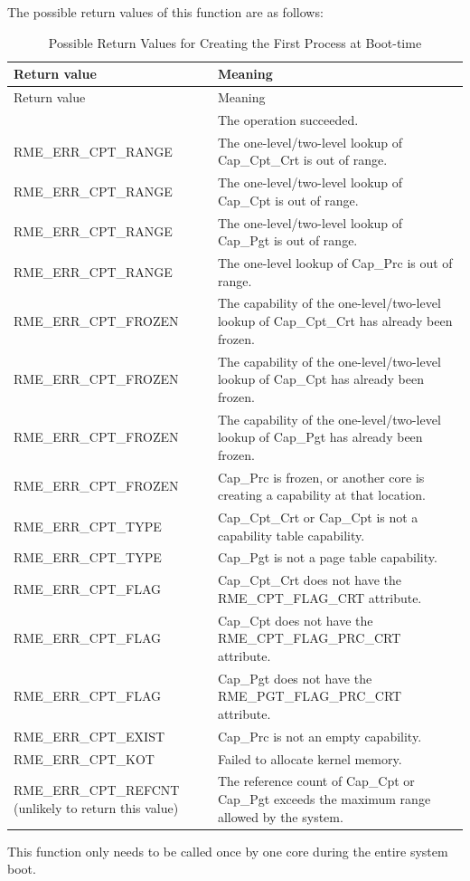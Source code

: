 The possible return values of this function are as follows:

\begin{xltabular}{\textwidth}{@{}>{\hsize\raggedright\arraybackslash}X>{\hsize\raggedright\arraybackslash}X@{}}
\caption{Possible Return Values for Creating the First Process at Boot-time}\label{tab:7-52-create-first-process-at-boot-return-values}\\
\toprule
Return value & Meaning\tabularnewline
\endfirsthead
\toprule
Return value & Meaning\tabularnewline
\midrule
\endhead
\bottomrule
{} & The operation succeeded.\tabularnewline
    RME\_ERR\_CPT\_RANGE & The one-level/two-level lookup of Cap\_Cpt\_Crt is out of range.\tabularnewline
    RME\_ERR\_CPT\_RANGE & The one-level/two-level lookup of Cap\_Cpt is out of range.\tabularnewline
    RME\_ERR\_CPT\_RANGE & The one-level/two-level lookup of Cap\_Pgt is out of range.\tabularnewline
    RME\_ERR\_CPT\_RANGE & The one-level lookup of Cap\_Prc is out of range.\tabularnewline
    RME\_ERR\_CPT\_FROZEN & The capability of the one-level/two-level lookup of Cap\_Cpt\_Crt has already been frozen.\tabularnewline
    RME\_ERR\_CPT\_FROZEN & The capability of the one-level/two-level lookup of Cap\_Cpt has already been frozen.\tabularnewline
    RME\_ERR\_CPT\_FROZEN & The capability of the one-level/two-level lookup of Cap\_Pgt has already been frozen.\tabularnewline
    RME\_ERR\_CPT\_FROZEN & Cap\_Prc is frozen, or another core is creating a capability at that location.\tabularnewline
    RME\_ERR\_CPT\_TYPE & Cap\_Cpt\_Crt or Cap\_Cpt is not a capability table capability.\tabularnewline
    RME\_ERR\_CPT\_TYPE & Cap\_Pgt is not a page table capability.\tabularnewline
    RME\_ERR\_CPT\_FLAG & Cap\_Cpt\_Crt does not have the RME\_CPT\_FLAG\_CRT attribute.\tabularnewline
    RME\_ERR\_CPT\_FLAG & Cap\_Cpt does not have the RME\_CPT\_FLAG\_PRC\_CRT attribute.\tabularnewline
    RME\_ERR\_CPT\_FLAG & Cap\_Pgt does not have the RME\_PGT\_FLAG\_PRC\_CRT attribute.\tabularnewline
    RME\_ERR\_CPT\_EXIST & Cap\_Prc is not an empty capability.\tabularnewline
    RME\_ERR\_CPT\_KOT & Failed to allocate kernel memory.\tabularnewline
    RME\_ERR\_CPT\_REFCNT (unlikely to return this value) & The reference count of Cap\_Cpt or Cap\_Pgt exceeds the maximum range allowed by the system.\tabularnewline
\end{xltabular}
\nopagebreak[4]

This function only needs to be called once by one core during the entire system boot.

